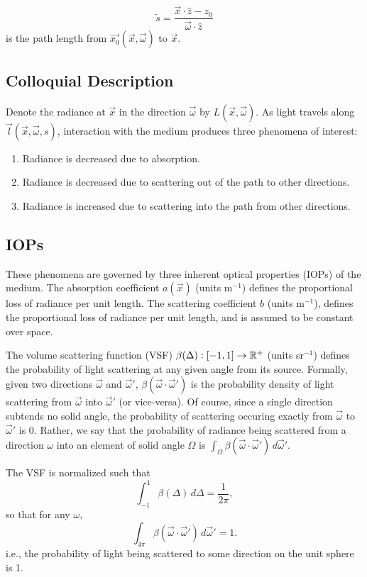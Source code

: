 \begin{equation}
  \tilde{s} = \frac{\vec{x} \cdot \hat{z} - z_0}{\vec{\omega} \cdot \hat{z}}
\end{equation}
is the path length from $\vec{x_0}(\vec{x}, \vec{\omega})$ to $\vec{x}$.

\subsection{Colloquial Description}
Denote the radiance at $\vec{x}$ in the direction $\vec{\omega}$ by $L(\vec{x}, \vec{\omega})$.
As light travels along $\vec{l}(\vec{x}, \vec{\omega}, s)$, interaction with the
medium produces three phenomena of interest:
\begin{enumerate}
  \item Radiance is decreased due to absorption.
  \item Radiance is decreased due to scattering out of the path to other
    directions.
  \item Radiance is increased due to scattering into the path from other
      directions.
\end{enumerate}

\subsection{IOPs}
These phenomena are governed by three inherent optical properties (IOPs) of the
medium.
The absorption coefficient $a(\vec{x})$ (units m$^{-1}$) defines the
proportional loss of radiance per unit length.
The scattering coefficient $b$ (units m$^{-1}$), defines the proportional loss
of radiance per unit length, and is assumed to be constant over space.

The volume scattering function (VSF) $\beta(\Delta): [-1, 1] \to \mathbb{R}^+$ (units sr$^{-1}$) defines the probability of light scattering at any given angle from its source.
Formally, given two directions $\vec{\omega}$ and $\vec{\omega}'$, $\beta(\vec{\omega} \cdot \vec{\omega}')$ is the probability density of light scattering from $\vec{\omega}$ into $\vec{\omega}'$ (or vice-versa).
Of course, since a single direction subtends no solid angle, the probability of scattering occuring exactly from $\vec{\omega}$ to $\vec{\omega}'$ is 0.
Rather, we say that the probability of radiance being scattered from a direction $\omega$ into an element of solid angle $\Omega$ is $\int_\Omega \beta(\vec{\omega} \cdot \vec{\omega}')\, d\vec{\omega}'$.

The VSF is normalized such that
\begin{equation}
  \int_{-1}^1\beta(\Delta)\, d\Delta=\frac{1}{2\pi},
\end{equation}
so that for any $\omega$,
\begin{equation}
  \int_{4\pi}\beta(\vec{\omega}\cdot\vec{\omega}')\, d\vec{\omega}' = 1.
\end{equation}
i.e., the probability of light being scattered to some direction on the unit sphere is 1.

